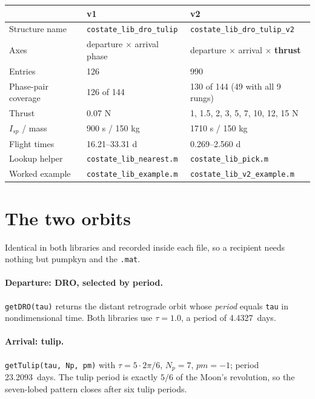 \documentclass[11pt]{article}
\begin{document}
\begin{center}
\begin{tabular}{lll}
\toprule
 & \textbf{v1} & \textbf{v2} \\
\midrule
Structure name      & \texttt{costate\_lib\_dro\_tulip} & \texttt{costate\_lib\_dro\_tulip\_v2} \\
Axes                & departure $\times$ arrival phase & departure $\times$ arrival $\times$ \textbf{thrust} \\
Entries             & 126 & 990 \\
Phase-pair coverage & 126 of 144 & 130 of 144 (49 with all 9 rungs) \\
Thrust              & 0.07 N & 1, 1.5, 2, 3, 5, 7, 10, 12, 15 N \\
$I_{sp}$ / mass     & 900 s / 150 kg & 1710 s / 150 kg \\
Flight times        & 16.21--33.31 d & 0.269--2.560 d \\
Lookup helper       & \texttt{costate\_lib\_nearest.m} & \texttt{costate\_lib\_pick.m} \\
Worked example      & \texttt{costate\_lib\_example.m} & \texttt{costate\_lib\_v2\_example.m} \\
\bottomrule
\end{tabular}
\end{center}

\section{The two orbits}

Identical in both libraries and recorded inside each file, so a recipient
needs nothing but pumpkyn and the \texttt{.mat}.

\paragraph{Departure: DRO, selected by period.} \texttt{getDRO(tau)} returns
the distant retrograde orbit whose \emph{period} equals \texttt{tau} in
nondimensional time. Both libraries use $\tau = 1.0$, a period of
4.4327~days.

\paragraph{Arrival: tulip.} \texttt{getTulip(tau, Np, pm)} with
$\tau = 5\cdot 2\pi/6$, $N_p = 7$, $pm = -1$; period 23.2093~days. The tulip
period is exactly $5/6$ of the Moon's revolution, so the seven-lobed pattern
closes after six tulip periods.
\end{document}
